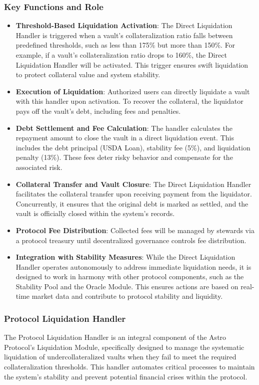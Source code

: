 \subsubsection{Key Functions and Role}
\begin{itemize}
    \item \textbf{Threshold-Based Liquidation Activation}: The Direct Liquidation Handler is triggered when a vault's collateralization ratio falls between predefined thresholds, such as less than 175\% but more than 150\%. For example, if a vault's collateralization ratio drops to 160\%, the Direct Liquidation Handler will be activated. This trigger ensures swift liquidation to protect collateral value and system stability.
    \item \textbf{Execution of Liquidation}: Authorized users can directly liquidate a vault with this handler upon activation. To recover the collateral, the liquidator pays off the vault's debt, including fees and penalties.
    \item \textbf{Debt Settlement and Fee Calculation}: The handler calculates the repayment amount to close the vault in a direct liquidation event. This includes the debt principal (USDA Loan), stability fee (5\%), and liquidation penalty (13\%). These fees deter risky behavior and compensate for the associated risk.
    \item \textbf{Collateral Transfer and Vault Closure}: The Direct Liquidation Handler facilitates the collateral transfer upon receiving payment from the liquidator. Concurrently, it ensures that the original debt is marked as settled, and the vault is officially closed within the system’s records.
    \item \textbf{Protocol Fee Distribution}: Collected fees will be managed by stewards via a protocol treasury until decentralized governance controls fee distribution.

    \item \textbf{Integration with Stability Measures}: While the Direct Liquidation Handler operates autonomously to address immediate liquidation needs, it is designed to work in harmony with other protocol components, such as the Stability Pool and the Oracle Module. This ensures actions are based on real-time market data and contribute to protocol stability and liquidity.
\end{itemize}

\subsubsection{Protocol Liquidation Handler}
The Protocol Liquidation Handler is an integral component of the Astro Protocol’s Liquidation Module, specifically designed to manage the systematic liquidation of undercollateralized vaults when they fail to meet the required collateralization thresholds. This handler automates critical processes to maintain the system's stability and prevent potential financial crises within the protocol.

